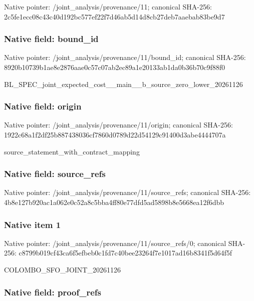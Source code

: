 \documentclass[10pt,a4paper]{article}
\begin{document}
Native pointer: /joint\_analysis/provenance/11; canonical SHA-256: 2c5fe1ecc08c43c40d192bc5\allowbreak{}77ef22f7d46ab5d14d8cb27d\allowbreak{}eb7aaebab83be9d7



\subsubsection{Native field: bound\_id}


Native pointer: /joint\_analysis/provenance/11/bound\_id; canonical SHA-256: 8920b10739b1ae8e2876aae0\allowbreak{}c57c07ab2ec89a1e20133ab1\allowbreak{}da0b36b70c9f88f0


BL\_SPEC\_joint\_expected\_c\allowbreak{}ost\_\_main\_\_b\_source\_zero\allowbreak{}\_lower\_20261126


\subsubsection{Native field: origin}


Native pointer: /joint\_analysis/provenance/11/origin; canonical SHA-256: 1922c68a1f2df25b88743803\allowbreak{}6cf7860d0789d22d54129c91\allowbreak{}400d3abe4444707a


source\_statement\_with\_contract\_mapping


\subsubsection{Native field: source\_refs}


Native pointer: /joint\_analysis/provenan\allowbreak{}ce/11/source\_refs; canonical SHA-256: 4b8e127b920ac1a062e0c52a\allowbreak{}8c5bba4ff80e77dfd5ad5898\allowbreak{}b8e5668ea12f6dbb



\subsubsection{Native item 1}


Native pointer: /joint\_analysis/provenan\allowbreak{}ce/11/source\_refs/0; canonical SHA-256: c8799b019cf43ca6f5efbeb0\allowbreak{}c1fd7c40bee23264f7e1017a\allowbreak{}d16b8341f5d64f5f


COLOMBO\_SFO\_JOINT\_20261126


\subsubsection{Native field: proof\_refs}
\end{document}
